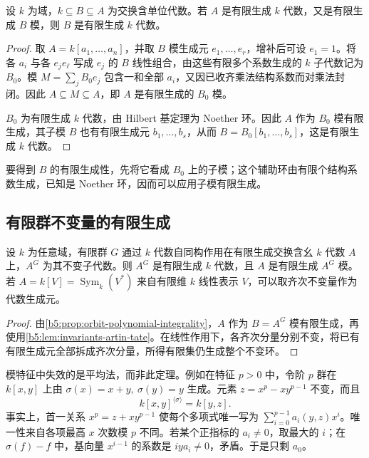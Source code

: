 \begin{lemma}\label{b5:lem:invariants-artin-tate}
	设 \(k\) 为域，\(k\subseteq B\subseteq A\) 为交换含单位代数。若 \(A\) 是有限生成 \(k\) 代数，又是有限生成 \(B\) 模，则 \(B\) 是有限生成 \(k\) 代数。
\end{lemma}
\begin{proof}
	取 \(A=k[a_1,\ldots,a_n]\)，并取 \(B\) 模生成元 \(e_1,\ldots,e_r\)，增补后可设 \(e_1=1\)。将各 \(a_i\) 与各 \(e_je_\ell\) 写成 \(e_j\) 的 \(B\) 线性组合，由这些有限多个系数生成的 \(k\) 子代数记为 \(B_0\)。模 \(M=\sum_j B_0e_j\) 包含一和全部 \(a_i\)，又因已收齐乘法结构系数而对乘法封闭。因此 \(A\subseteq M\subseteq A\)，即 \(A\) 是有限生成的 \(B_0\) 模。

	\(B_0\) 为有限生成 \(k\) 代数，由 Hilbert 基定理为 Noether 环。因此 \(A\) 作为 \(B_0\) 模有限生成，其子模 \(B\) 也有有限生成元 \(b_1,\ldots,b_s\)，从而 \(B=B_0[b_1,\ldots,b_s]\)，这是有限生成 \(k\) 代数。
\end{proof}

要得到 \(B\) 的有限生成性，先将它看成 \(B_0\) 上的子模；这个辅助环由有限个结构系数生成，已知是 Noether 环，因而可以应用子模有限生成。

\subsection{有限群不变量的有限生成}
\label{b5:subsec:2202:03}

\begin{theorem}\label{b5:thm:finite-invariant-generation}
	设 \(k\) 为任意域，有限群 \(G\) 通过 \(k\) 代数自同构作用在有限生成交换含幺 \(k\) 代数 \(A\) 上，\(A^G\) 为其不变子代数。则 \(A^G\) 是有限生成 \(k\) 代数，且 \(A\) 是有限生成 \(A^G\) 模。若 \(A=k[V]=\operatorname{Sym}_k(V^*)\) 来自有限维 \(k\) 线性表示 \(V\)，可以取齐次不变量作为代数生成元。
\end{theorem}
\begin{proof}
	由\cref{b5:prop:orbit-polynomial-integrality}，\(A\) 作为 \(B=A^G\) 模有限生成，再使用\cref{b5:lem:invariants-artin-tate}。在线性作用下，各齐次分量分别不变，将已有有限生成元全部拆成齐次分量，所得有限集仍生成整个不变环。
\end{proof}

模特征中失效的是平均法，而非此定理。例如在特征 \(p>0\) 中，令阶 \(p\) 群在 \(k[x,y]\) 上由 \(\sigma(x)=x+y,\ \sigma(y)=y\) 生成。元素 \(z=x^p-xy^{p-1}\) 不变，而且
\begin{equation}\label{b5:eq:modular-transvection-invariants}
	k[x,y]^{\langle\sigma\rangle}=k[y,z].
\end{equation}
事实上，首一关系 \(x^p=z+xy^{p-1}\) 使每个多项式唯一写为 \(\sum_{i=0}^{p-1}a_i(y,z)x^i\)。唯一性来自各项最高 \(x\) 次数模 \(p\) 不同。若某个正指标的 \(a_i\ne0\)，取最大的 \(i\)；在 \(\sigma(f)-f\) 中，基向量 \(x^{i-1}\) 的系数是 \(iya_i\ne0\)，矛盾。于是只剩 \(a_0\)。

